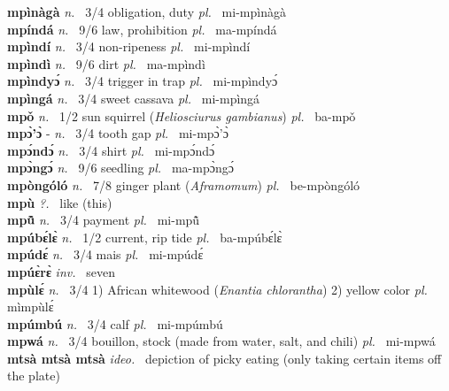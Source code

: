 {\bfseries mpìnàgà}  {\itshape n.~} 3/4 obligation, duty {\itshape pl.~} mi-mpìnàgà    \\ 
{\bfseries mpíndá}  {\itshape n.~} 9/6 law, prohibition {\itshape pl.~} ma-mpíndá    \\ 
{\bfseries mpìndí}  {\itshape n.~} 3/4 non-ripeness {\itshape pl.~} mi-mpìndí    \\ 
{\bfseries mpìndì}  {\itshape n.~} 9/6 dirt {\itshape pl.~} ma-mpìndì    \\ 
{\bfseries mpìndyɔ́}  {\itshape n.~} 3/4 trigger in trap {\itshape pl.~} mi-mpìndyɔ́    \\ 
{\bfseries mpìngá}  {\itshape n.~} 3/4 sweet cassava {\itshape pl.~} mi-mpìngá    \\ 
{\bfseries mpǒ}  {\itshape n.~} 1/2 sun squirrel ({\itshape Heliosciurus gambianus}) {\itshape pl.~} ba-mpǒ    \\ 
{\bfseries mpɔ̀'ɔ̀} - {\itshape n.~} 3/4 tooth gap {\itshape pl.~} mi-mpɔ̀'ɔ̀    \\ 
{\bfseries mpɔ́ndɔ́}  {\itshape n.~} 3/4 shirt {\itshape pl.~} mi-mpɔ́ndɔ́    \\ 
{\bfseries mpɔ̀ngɔ́}  {\itshape n.~} 9/6 seedling {\itshape pl.~} ma-mpɔ̀ngɔ́    \\ 
{\bfseries mpòngóló}  {\itshape n.~} 7/8 ginger plant ({\itshape Aframomum}) {\itshape pl.~} be-mpòngóló    \\ 
{\bfseries mpù}  {\itshape ?.~} like (this)    \\ 
{\bfseries mpũ̂}  {\itshape n.~} 3/4 payment {\itshape pl.~} mi-mpũ̂    \\ 
{\bfseries mpúbɛ́lɛ̀}  {\itshape n.~} 1/2 current, rip tide {\itshape pl.~} ba-mpúbɛ́lɛ̀    \\ 
{\bfseries mpúdɛ́}  {\itshape n.~} 3/4 mais {\itshape pl.~} mi-mpúdɛ́    \\ 
{\bfseries mpúɛ̀rɛ̀}  {\itshape inv.~} seven    \\ 
{\bfseries mpùlɛ́}  {\itshape n.~} 3/4 1) African whitewood ({\itshape Enantia chlorantha}) 2) yellow color {\itshape pl.~} mìmpùlɛ́    \\ 
{\bfseries mpúmbú}  {\itshape n.~} 3/4 calf {\itshape pl.~} mi-mpúmbú    \\ 
{\bfseries mpwá} {\itshape n.~} 3/4 bouillon, stock (made from water, salt, and chili) {\itshape pl.~} mi-mpwá    \\ 
{\bfseries mtsà mtsà mtsà}  {\itshape ideo.~} depiction of picky eating (only taking certain items off the plate)    \\ 
